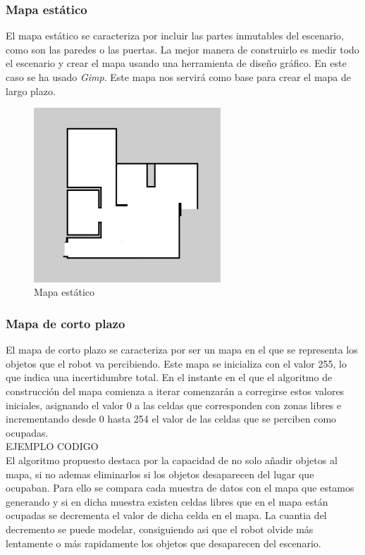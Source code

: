 \subsubsection{Mapa estático}
El mapa estático se caracteriza por incluir las partes inmutables del escenario, como son las paredes o las puertas. La mejor manera de construirlo es medir todo el escenario y crear el mapa usando una herramienta de diseño gráfico. En este caso se ha usado \textit{Gimp}.
Este mapa nos servirá como base para crear el mapa de largo plazo.

\begin{figure} [hbtp]
  \begin{center}
    \includegraphics[width=7cm]{img/cap4/mapaestatico}
  \end{center}
  \caption{Mapa estático}
  \label{fig:mapaestatico}
\end{figure}

\subsubsection{Mapa de corto plazo}
El mapa de corto plazo se caracteriza por ser un mapa en el que se representa los objetos que el robot va percibiendo. Este mapa se inicializa con el valor 255, lo que indica una incertidumbre total. En el instante en el que el algoritmo de construcción del mapa comienza a iterar comenzarán a corregirse estos valores iniciales, asignando el valor 0 a las celdas que corresponden con zonas libres e incrementando desde 0 hasta 254 el valor de las celdas que se perciben como ocupadas. \\

{EJEMPLO CODIGO}\\

El algoritmo propuesto destaca por la capacidad de no solo añadir objetos al mapa, si no ademas eliminarlos si los objetos desaparecen del lugar que ocupaban. Para ello se compara cada muestra de datos con el mapa que estamos generando y si en dicha muestra existen celdas libres que en el mapa están ocupadas se decrementa el valor de dicha celda en el mapa. La cuantia del decremento se puede modelar, consiguiendo asi que el robot olvide más lentamente o más rapidamente los objetos que desaparecen del escenario.\\

